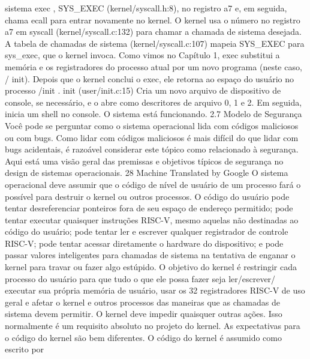 sistema  exec ,  SYS_EXEC  (kernel/syscall.h:8),  no  registro  a7  e,  em  seguida,  chama  ecall  para  entrar  novamente  no  
kernel.
 O  kernel  usa  o  número  no  registro  a7  em  syscall  (kernel/syscall.c:132)  para  chamar  a  chamada  de  sistema  desejada.  
A  tabela  de  chamadas  de  sistema  (kernel/syscall.c:107)  mapeia  SYS_EXEC  para  sys_exec,  que  o  kernel  invoca.  Como  
vimos  no  Capítulo  1,  exec  substitui  a  memória  e  os  registradores  do  processo  atual  por  um  novo  programa  (neste  caso, /
 init).
 Depois  que  o  kernel  conclui  o  exec,  ele  retorna  ao  espaço  do  usuário  no  processo /init .  init  (user/init.c:15)  Cria  um  
novo  arquivo  de  dispositivo  de  console,  se  necessário,  e  o  abre  como  descritores  de  arquivo  0,  1  e  2.  Em  seguida,  inicia  
um  shell  no  console.  O  sistema  está  funcionando.
 2.7  Modelo  de  Segurança
 Você  pode  se  perguntar  como  o  sistema  operacional  lida  com  códigos  maliciosos  ou  com  bugs.  Como  lidar  com  códigos  
maliciosos  é  mais  difícil  do  que  lidar  com  bugs  acidentais,  é  razoável  considerar  este  tópico  como  relacionado  à  
segurança.  Aqui  está  uma  visão  geral  das  premissas  e  objetivos  típicos  de  segurança  no  design  de  sistemas  operacionais.
 28
Machine Translated by Google
 O  sistema  operacional  deve  assumir  que  o  código  de  nível  de  usuário  de  um  processo  fará  o  possível  para  destruir  o  
kernel  ou  outros  processos.  O  código  do  usuário  pode  tentar  desreferenciar  ponteiros  fora  de  seu  espaço  de  endereço  
permitido;  pode  tentar  executar  quaisquer  instruções  RISC-V,  mesmo  aquelas  não  destinadas  ao  código  do  usuário;  pode  
tentar  ler  e  escrever  qualquer  registrador  de  controle  RISC-V;  pode  tentar  acessar  diretamente  o  hardware  do  dispositivo;  e  
pode  passar  valores  inteligentes  para  chamadas  de  sistema  na  tentativa  de  enganar  o  kernel  para  travar  ou  fazer  algo  
estúpido.  O  objetivo  do  kernel  é  restringir  cada  processo  do  usuário  para  que  tudo  o  que  ele  possa  fazer  seja  ler/escrever/
 executar  sua  própria  memória  de  usuário,  usar  os  32  registradores  RISC-V  de  uso  geral  e  afetar  o  kernel  e  outros  processos  
das  maneiras  que  as  chamadas  de  sistema  devem  permitir.  O  kernel  deve  impedir  quaisquer  outras  ações.  Isso  normalmente  
é  um  requisito  absoluto  no  projeto  do  kernel.
 As  expectativas  para  o  código  do  kernel  são  bem  diferentes.  O  código  do  kernel  é  assumido  como  escrito  por  
